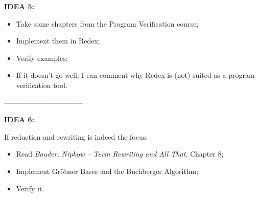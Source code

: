 {  \textbf{IDEA 5:}
  \begin{itemize}
  \item Take some chapters from the Program Verification course;
  \item Implement them in Redex;
  \item Verify examples;
  \item If it doesn't go well, I can comment why Redex is (not) suited as
    a program verification tool.
  \end{itemize}


  ---------------------------------

  \textbf{IDEA 6:}

  If reduction and rewriting is indeed the focus:
  \begin{itemize}
  \item Read \emph{Baader, Nipkow -- Term Rewriting and All That}, Chapter 8;
  \item Implement Gr\"obner Bases and the Buchberger Algorithm;
  \item Verify it.
  \end{itemize}
  
}

